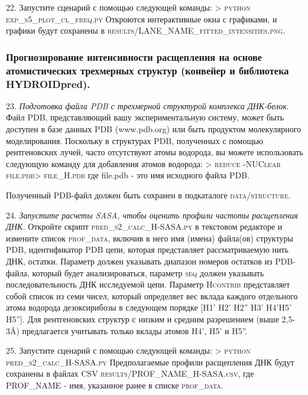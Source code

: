     22. Запустите сценарий с помощью следующей команды:
        \textsc{> python exp\_s5\_plot\_cl\_freq.py}
        Откроются интерактивные окна с графиками, и графики будут сохранены в \textsc{results/LANE\_NAME\_fitted\_intensities.png}.
    
    \subsubsection{Прогнозирование интенсивности расщепления на основе атомистических трехмерных структур (конвейер и библиотека HYDROIDpred).}
    
    23.     \emph{Подготовка файла PDB с трехмерной структурой комплекса ДНК-белок}. Файл PDB, представляющий вашу экспериментальную систему, может быть доступен в базе данных PDB (www.pdb.org) или быть продуктом молекулярного моделирования. Поскольку в структурах PDB, полученных с помощью рентгеновских лучей, часто отсутствуют атомы водорода, вы можете использовать следующую команду для добавления атомов водорода:
    \textsc{> reduce -NUClear file.pdb> file\_H.pdb}
    где file.pdb - это имя исходного файла PDB.
    
    
    Полученный PDB-файл должен быть сохранен в подкаталоге \textsc{data/structure}.

    
    
    
    24. \emph{Запустите расчеты SASA, чтобы оценить профили частоты расщепления ДНК.} Откройте скрипт \textsc{pred\_s2\_calc\_H-SASA.py} в текстовом редакторе и измените список \textsc{prof\_data}, включив в него имя (имена) файла(ов) структуры PDB, идентификатор PDB цепи, которая представляет рассматриваемую нить ДНК, остатки. Параметр должен указывать диапазон номеров остатков из PDB-файла, который будет анализироваться, параметр \textsc{seq} должен указывать последовательность ДНК исследуемой цепи. Параметр \textsc{Hcontrib}  представляет собой список из семи чисел, который определяет вес вклада каждого отдельного атома водорода дезоксирибозы в следующем порядке [H1' H2' H2'' H3' H4'H5' H5'']. Для рентгеновских структур с низким и средним разрешением (выше 2,5-3\AA) предлагается учитывать только вклады атомов H4', H5' и H5''.

    25. Запустите сценарий с помощью следующей команды:
            \textsc{> python pred\_s2\_calc\_H-SASA.py}
        Предполагаемые профили расщепления ДНК будут сохранены в файлах CSV \textsc{results/PROF\_NAME\_H-SASA.csv}, где PROF\_NAME - имя, указанное ранее в списке \textsc{prof\_data}.


